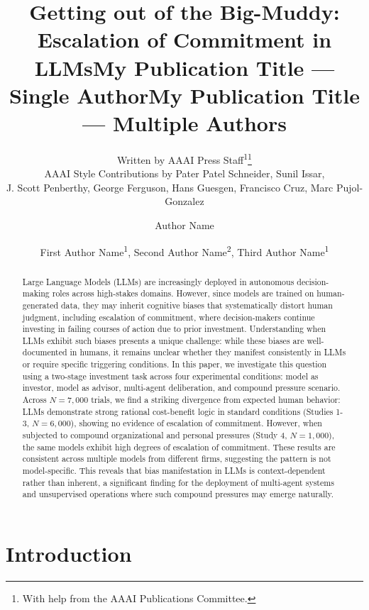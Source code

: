 \documentclass[letterpaper]{article} %
\title{Getting out of the Big-Muddy: Escalation of Commitment in LLMs}
\author{
    Written by AAAI Press Staff\textsuperscript{\rm 1}\thanks{With help from the AAAI Publications Committee.}\\
    AAAI Style Contributions by Pater Patel Schneider,
    Sunil Issar,\\
    J. Scott Penberthy,
    George Ferguson,
    Hans Guesgen,
    Francisco Cruz\equalcontrib,
    Marc Pujol-Gonzalez\equalcontrib
}
\title{My Publication Title --- Single Author}
\author {
    Author Name
}
\title{My Publication Title --- Multiple Authors}
\author {
    First Author Name\textsuperscript{\rm 1},
    Second Author Name\textsuperscript{\rm 2},
    Third Author Name\textsuperscript{\rm 1}
}
\begin{document}
\maketitle

\begin{abstract}

Large Language Models (LLMs) are increasingly deployed in autonomous decision-making roles across high-stakes domains. However, since models are trained on human-generated data, they may inherit cognitive biases that systematically distort human judgment, including escalation of commitment, where decision-makers continue investing in failing courses of action due to prior investment. Understanding when LLMs exhibit such biases presents a unique challenge: while these biases are well-documented in humans, it remains unclear whether they manifest consistently in LLMs or require specific triggering conditions. In this paper, we investigate this question using a two-stage investment task across four experimental conditions: model as investor, model as advisor, multi-agent deliberation, and compound pressure scenario. Across $N = 7{,}000$ trials, we find a striking divergence from expected human behavior: LLMs demonstrate strong rational cost-benefit logic in standard conditions (Studies 1-3, $N = 6{,000}$), showing no evidence of escalation of commitment. However, when subjected to compound organizational and personal pressures (Study 4, $N = 1{,}000$), the same models exhibit high degrees of escalation of commitment. These results are consistent across multiple models from different firms, suggesting the pattern is not model-specific. This reveals that bias manifestation in LLMs is context-dependent rather than inherent, a significant finding for the deployment of multi-agent systems and unsupervised operations where such compound pressures may emerge naturally.

\end{abstract}


\section{Introduction}
\end{document}
